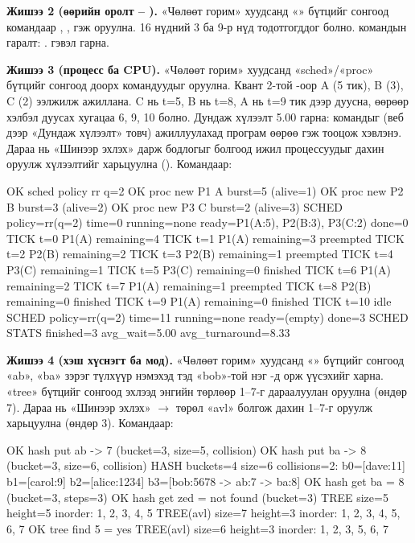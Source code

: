 \textbf{Жишээ 2 (өөрийн оролт -- ).} «Чөлөөт горим» хуудсанд «» бүтцийг сонгоод командаар , ,  гэж оруулна. 16 нүдний 3 ба 9-р нүд тодотгогддог болно.  командын гаралт: .  гэвэл  гарна.

\textbf{Жишээ 3 (процесс ба CPU).} «Чөлөөт горим» хуудсанд «sched»/«proc» бүтцийг сонгоод доорх командуудыг оруулна. Квант 2-той -оор A (5 тик), B (3), C (2) ээлжилж ажиллана. C нь t=5, B нь t=8, A нь t=9 тик дээр дуусна, өөрөөр хэлбэл дуусах хугацаа 6, 9, 10 болно. Дундаж хүлээлт 5.00 гарна:  командыг (веб дээр «Дундаж хүлээлт» товч) ажиллуулахад програм өөрөө  гэж тооцож хэвлэнэ. Дараа нь «Шинээр эхлэх» дарж бодлогыг  болгоод ижил процессуудыг дахин оруулж хүлээлтийг харьцуулна (). Командаар: 
\begin{codeblock}
OK sched policy rr q=2
OK proc new P1 A burst=5 (alive=1)
OK proc new P2 B burst=3 (alive=2)
OK proc new P3 C burst=2 (alive=3)
SCHED policy=rr(q=2) time=0 running=none ready=P1(A:5), P2(B:3), P3(C:2) done=0
TICK t=0 P1(A) remaining=4
TICK t=1 P1(A) remaining=3 preempted
TICK t=2 P2(B) remaining=2
TICK t=3 P2(B) remaining=1 preempted
TICK t=4 P3(C) remaining=1
TICK t=5 P3(C) remaining=0 finished
TICK t=6 P1(A) remaining=2
TICK t=7 P1(A) remaining=1 preempted
TICK t=8 P2(B) remaining=0 finished
TICK t=9 P1(A) remaining=0 finished
TICK t=10 idle
SCHED policy=rr(q=2) time=11 running=none ready=(empty) done=3
SCHED STATS finished=3 avg_wait=5.00 avg_turnaround=8.33
\end{codeblock}

\textbf{Жишээ 4 (хэш хүснэгт ба мод).} «Чөлөөт горим» хуудсанд «» бүтцийг сонгоод «ab», «ba» зэрэг түлхүүр нэмэхэд тэд «bob»-той нэг -д орж  үүсэхийг харна. «tree» бүтцийг сонгоод эхлээд энгийн төрлөөр 1--7-г дараалуулан оруулна (өндөр 7). Дараа нь «Шинээр эхлэх» $\rightarrow$ төрөл «avl» болгож дахин 1--7-г оруулж харьцуулна (өндөр 3). Командаар: 
\begin{codeblock}
OK hash put ab -> 7 (bucket=3, size=5, collision)
OK hash put ba -> 8 (bucket=3, size=6, collision)
HASH buckets=4 size=6 collisions=2: b0=[dave:11] b1=[carol:9] b2=[alice:1234] b3=[bob:5678 -> ab:7 -> ba:8]
OK hash get ba = 8 (bucket=3, steps=3)
OK hash get zed = not found (bucket=3)
TREE size=5 height=5 inorder: 1, 2, 3, 4, 5
TREE(avl) size=7 height=3 inorder: 1, 2, 3, 4, 5, 6, 7
OK tree find 5 = yes
TREE(avl) size=6 height=3 inorder: 1, 2, 3, 5, 6, 7
\end{codeblock}

